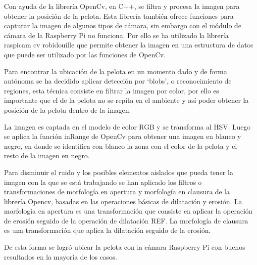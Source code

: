 Con ayuda de la librería OpenCv, en C++, se filtra y procesa la imagen para obtener la posición de la pelota. Esta librería también ofrece funciones para capturar la imagen de algunos tipos de cámara, sin embargo con el módulo de cámara de la Raspberry Pi no funciona. Por ello se ha utilizado la librería raspicam cv robidouille que permite obtener la imagen en una estructura de datos que puede ser utilizado por las funciones de OpenCv. 

Para encontrar la ubicación de la pelota en un momento dado y de forma autónoma se ha decidido aplicar detección por ‘blobs’, o reconocimiento de regiones, esta técnica consiste en filtrar la imagen por color, por ello es importante que el de la pelota no se repita en el ambiente y así poder obtener la posición de la pelota dentro de la imagen.

La imagen es captada en el modelo de color RGB y se transforma al HSV. Luego se aplica la función inRange de OpenCv para obtener una imagen en blanco y negro, en donde se identifica con blanco la zona con el color de la pelota y el resto de la imagen en negro. 

Para disminuir el ruido y los posibles elementos aislados que pueda tener la imagen con la que se está trabajando se han aplicado los filtros o transformaciones de morfología en apertura y morfología en clausura de la librería Opencv, basadas en las operaciones básicas de dilatación y erosión. La morfología en apertura es una transformación que consiste en aplicar la operación de erosión seguido de la operación de dilatación REF. La morfología de clausura es una transformación que aplica la dilatación seguido de la erosión.

De esta forma se logró ubicar la pelota con la cámara Raspberry Pi con buenos resultados en la mayoría de los casos. 
 


